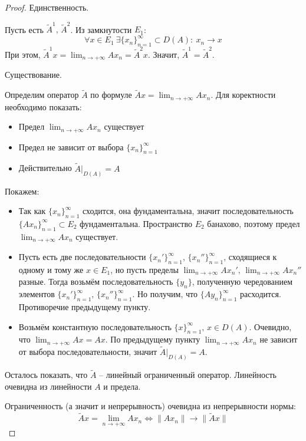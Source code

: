 \documentclass[a4paper,12pt]{article}
\theoremstyle{plain}
\theoremstyle{definition}
\theoremstyle{remark}
\begin{document}
\begin{proof}
  Единственность. 

  Пусть есть $\tilde{A}^1,\, \tilde{A}^2$. Из замкнутости $E_1$:
  \[
    \forall x \in E_1 \: \exists\{x_n\}_{n = 1}^\infty \subset D(A) :\: x_n \to x
  \]
  При этом, $\tilde{A}^1x = \lim_{n \to +\infty}Ax_n = \tilde{A}^2x$. Значит, $\tilde{A}^1 = \tilde{A}^2$.

  Существование.

  Определим оператор $\tilde{A}$ по формуле $\tilde{A}x = \lim_{n \to +\infty}Ax_n$. Для коректности необходимо показать:
  \begin{itemize}
    \item Предел $\lim_{n \to +\infty}Ax_n$ существует
    \item Предел не зависит от выбора $\{x_n\}_{n = 1}^\infty$
    \item Действительно $\tilde{A}|_{D(A)} = A$
  \end{itemize}

  Покажем:
  \begin{itemize}
    \item Так как $\{x_n\}_{n = 1}^\infty$ сходится, она фундаментальна, значит последовательность $\{Ax_n\}_{n = 1}^\infty \subset E_2$ фундаментальна. Пространство $E_2$ банахово, поэтому предел $\lim_{n \to +\infty}Ax_n$ существует.
    \item Пусть есть две последовательности $\{x_n'\}_{n=1}^\infty,\, \{x_n''\}_{n=1}^\infty$, сходящиеся к одному и тому же $x \in E_1$, но пусть пределы $\lim_{n \to +\infty} Ax_n',\, \lim_{n \to +\infty}Ax_n''$ разные. Тогда возьмём последовательность $\{y_n\}$, полученную чередованием элементов $\{x_n'\}_{n=1}^\infty,\, \{x_n''\}_{n=1}^\infty$. Но получим, что $\{Ay_n\}_{n=1}^\infty$ расходится. Противоречие предыдущему пункту.
    \item Возьмём константную последовательность $\{x\}_{n = 1}^\infty,\, x \in D(A)$. Очевидно, что $\lim_{n \to +\infty} Ax = Ax$. По предыдущему пункту $\lim_{n \to +\infty} Ax_n$ не зависит от выбора последовательности, значит $\tilde{A}|_{D(A)} = A$.
  \end{itemize}
  Осталось показать, что $\tilde{A}$ -- линейный ограниченный оператор. Линейность очевидна из линейности $A$ и предела.

  Ограниченность (а значит и непрерывность) очевидна из непрерывности нормы:
  \[
    \tilde{A}x = \lim_{n \to +\infty}Ax_n \Leftrightarrow \|Ax_n\| \to \|\tilde{A}x\|  
  \]
\end{proof}
\end{document}
